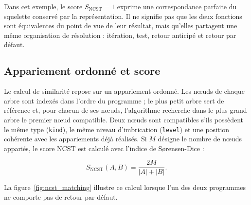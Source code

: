 {Dans cet exemple, le score $S_{\mathrm{NCST}}=1$ exprime une correspondance
parfaite du squelette conservé par la représentation. Il ne signifie pas que
les deux fonctions sont équivalentes du point de vue de leur résultat, mais
qu'elles partagent une même organisation de résolution : itération, test,
retour anticipé et retour par défaut.

\subsection{Appariement ordonné et score}

Le calcul de similarité repose sur un appariement ordonné. Les nœuds de
chaque arbre sont indexés dans l'ordre du programme ; le plus petit arbre
sert de référence et, pour chacun de ses nœuds, l'algorithme recherche dans
le plus grand arbre le premier nœud compatible. Deux nœuds sont compatibles
s'ils possèdent le même type (\texttt{kind}), le même niveau d'imbrication
(\texttt{level}) et une position cohérente avec les appariements déjà
réalisés. Si $M$ désigne le nombre de nœuds appariés, le score NCST est
calculé avec l'indice de Sørensen-Dice :

\begin{equation}
S_{\mathrm{NCST}}(A,B) = \frac{2M}{|A|+|B|}.
\end{equation}

La figure~\ref{fig:ncst_matching} illustre ce calcul lorsque l'un des deux
programmes ne comporte pas de retour par défaut.

\begin{figure}[H]
\centering
{}
\end{figure}}
